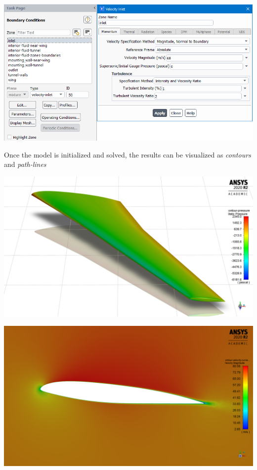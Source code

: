 \documentclass{article}
\begin{document}
\begin{center}
  \includegraphics[scale=0.60]{./img/inletBoundaryCondition.png}
\end{center}

Once the model is initialized and solved, the results can be visualized as \emph{contours} and \emph{path-lines}

\begin{center}
  \includegraphics[scale=0.20]{./img/pressure.png}
\end{center}

\begin{center}
  \includegraphics[scale=0.20]{./img/velocity_curvatureProfile.png}
\end{center}
\end{document}
